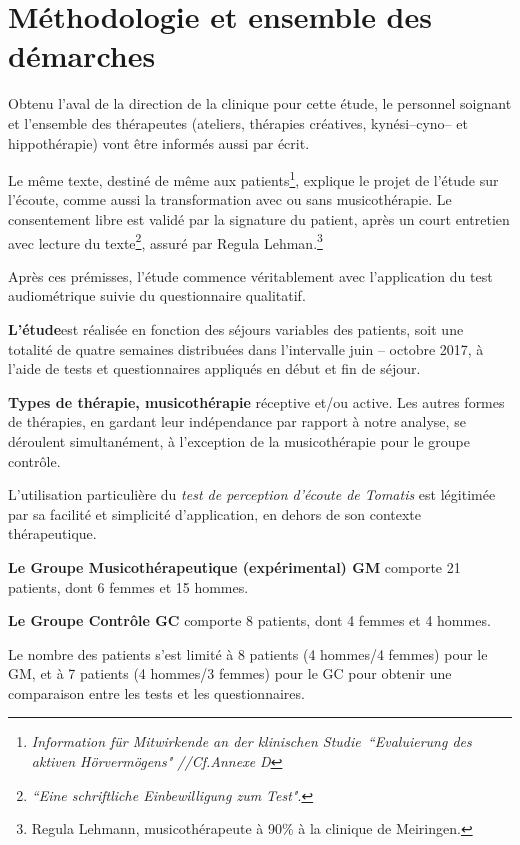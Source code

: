 \section{Méthodologie et  ensemble des démarches}
Obtenu l'aval de la direction de la
clinique pour cette étude,  le personnel soignant et l'ensemble des
thérapeutes (ateliers, thérapies créatives, kynési--cyno--
et hippothérapie) vont être informés aussi par écrit.

Le même texte, destiné de même aux
patients\footnote{ \emph{Information für Mitwirkende an der klinischen
  Studie\  ``Evaluierung des aktiven Hörvermögens" //Cf.Annexe D}
}, explique le projet de l'étude sur l'écoute, comme aussi la transformation
avec ou sans musicothérapie.
Le consentement libre est validé par la signature du patient, après
un court entretien avec lecture du texte\footnote{\emph{``Eine schriftliche Einbewilligung zum
    Test"}.}, assuré par  Regula Lehman.\footnote{Regula
  Lehmann, musicothérapeute  à 90\%  à la clinique de Meiringen.} 


Après ces prémisses, l'étude commence véritablement avec l'application du test
audiométrique suivie du questionnaire qualitatif.

\textbf{L'étude}est
réalisée en fonction des séjours variables des patients, soit une
totalité  de quatre semaines
distribuées dans l'intervalle juin --
octobre 2017,  à l'aide de tests et questionnaires appliqués en début
et fin de séjour.

\textbf{Types de thérapie, musicothérapie} réceptive et/ou active.
Les autres formes de thérapies, en gardant
leur indépendance par rapport à notre analyse, se déroulent simultanément, à
l'exception de la musicothérapie pour le groupe contrôle.

L'utilisation particulière du \textit{test de perception d'écoute de Tomatis}  est
légitimée par sa facilité et  simplicité d'application, en dehors de
son contexte thérapeutique.






\textbf{Le Groupe Musicothérapeutique (expérimental) GM} comporte 21
patients, dont 6
femmes et 15 hommes.


\textbf{Le  Groupe Contrôle GC} comporte 8 patients, dont 4 femmes et 4 hommes.


Le nombre
des patients s'est limité  à 8
patients (4 hommes/4 femmes) pour le GM, et à 7 patients (4 hommes/3
femmes) pour le GC pour obtenir une comparaison entre les tests et les questionnaires.




